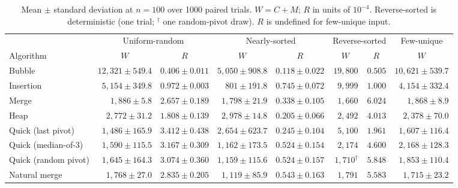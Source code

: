 \documentclass[10pt,journal]{IEEEtran}
\begin{document}
\begin{table}[!t]
\centering
\caption{Mean $\pm$ standard deviation at $n=100$ over 1000 paired trials. $W=C+M$; $R$ in units of $10^{-4}$. Reverse-sorted is deterministic (one trial; $^\dagger$ one random-pivot draw). $R$ is undefined for few-unique input.}
\label{tab:cost}
\scriptsize
\setlength{\tabcolsep}{4pt}
\begin{tabular}{@{}lrrrrrrr@{}}
\toprule
 & \multicolumn{2}{c}{Uniform-random} & \multicolumn{2}{c}{Nearly-sorted} & \multicolumn{2}{c}{Reverse-sorted} & \multicolumn{1}{c}{Few-unique} \\
\cmidrule(lr){2-3}\cmidrule(lr){4-5}\cmidrule(lr){6-7}\cmidrule(l){8-8}
Algorithm & \multicolumn{1}{c}{$W$} & \multicolumn{1}{c}{$R$} & \multicolumn{1}{c}{$W$} & \multicolumn{1}{c}{$R$} & \multicolumn{1}{c}{$W$} & \multicolumn{1}{c}{$R$} & \multicolumn{1}{c}{$W$} \\
\midrule
Bubble & $12{,}321\pm549.4$ & $0.406\pm0.011$ & $5{,}050\pm908.8$ & $0.118\pm0.022$ & $19{,}800$ & $0.505$ & $10{,}621\pm539.7$ \\
Insertion & $5{,}154\pm349.8$ & $0.972\pm0.003$ & $801\pm191.8$ & $0.745\pm0.072$ & $9{,}999$ & $1.000$ & $4{,}154\pm332.4$ \\
Merge & $1{,}886\pm5.8$ & $2.657\pm0.189$ & $1{,}798\pm21.9$ & $0.338\pm0.105$ & $1{,}660$ & $6.024$ & $1{,}868\pm8.9$ \\
Heap & $2{,}772\pm31.2$ & $1.808\pm0.139$ & $2{,}978\pm14.8$ & $0.205\pm0.066$ & $2{,}492$ & $4.013$ & $2{,}378\pm70.0$ \\
Quick (last pivot) & $1{,}486\pm165.9$ & $3.412\pm0.438$ & $2{,}654\pm623.7$ & $0.245\pm0.104$ & $5{,}100$ & $1.961$ & $1{,}607\pm116.4$ \\
Quick (median-of-3) & $1{,}590\pm115.5$ & $3.167\pm0.309$ & $1{,}162\pm173.5$ & $0.524\pm0.154$ & $2{,}174$ & $4.600$ & $2{,}168\pm128.3$ \\
Quick (random pivot) & $1{,}645\pm164.3$ & $3.074\pm0.360$ & $1{,}159\pm115.6$ & $0.524\pm0.157$ & $1{,}710^\dagger$ & $5.848$ & $1{,}853\pm110.4$ \\
Natural merge & $1{,}768\pm27.0$ & $2.835\pm0.205$ & $1{,}119\pm85.9$ & $0.543\pm0.163$ & $1{,}791$ & $5.583$ & $1{,}715\pm23.2$ \\
\bottomrule
\end{tabular}
\end{table}
\end{document}
